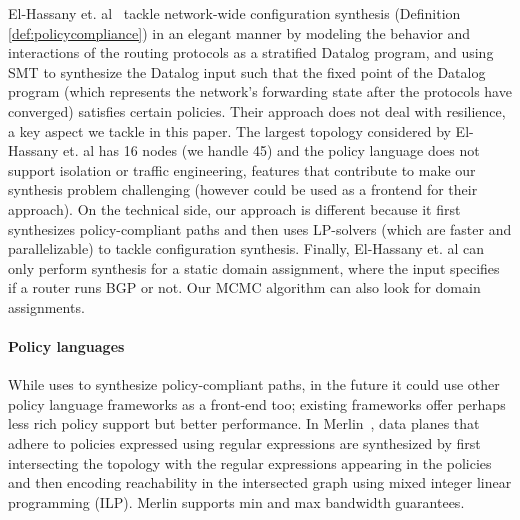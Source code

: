 El-Hassany et. al~\cite{synet} tackle network-wide configuration
synthesis (Definition \ref{def:policycompliance}) in an elegant manner by
modeling the behavior and interactions of the routing protocols as a
stratified Datalog program, and using SMT to synthesize the Datalog
input such that the fixed point of the Datalog program (which
represents the network's forwarding state after the protocols have
converged) satisfies certain policies.  
Their approach does not deal with resilience, a key aspect we tackle 
in this paper.
The
largest topology considered by El-Hassany et. al has 16 nodes (we handle 45)
and the policy language does not support isolation or
traffic engineering, 
features that contribute to make our synthesis 
problem challenging (however \genesis could be used 
as a frontend for their approach).  
On the technical side, our approach is different because
it first synthesizes policy-compliant paths and then uses
LP-solvers (which are faster and parallelizable) 
to tackle configuration
synthesis.  
Finally, El-Hassany et. al can only perform synthesis for a
static domain assignment, where the input specifies if a router runs
BGP or not. Our MCMC algorithm can also look for domain assignments.

%

\paragraph{Policy languages} While \name uses \genesis 
to synthesize policy-compliant paths, in the future it could use
other policy language frameworks as a front-end
too; existing frameworks offer perhaps less rich policy support but better
performance. %
In Merlin~\cite{merlin}, data planes that adhere to policies expressed
using regular expressions are synthesized by first intersecting the
topology with the regular expressions appearing in the policies and
then encoding reachability in the intersected graph using mixed
integer linear programming (ILP).  Merlin supports min and max
bandwidth guarantees.

